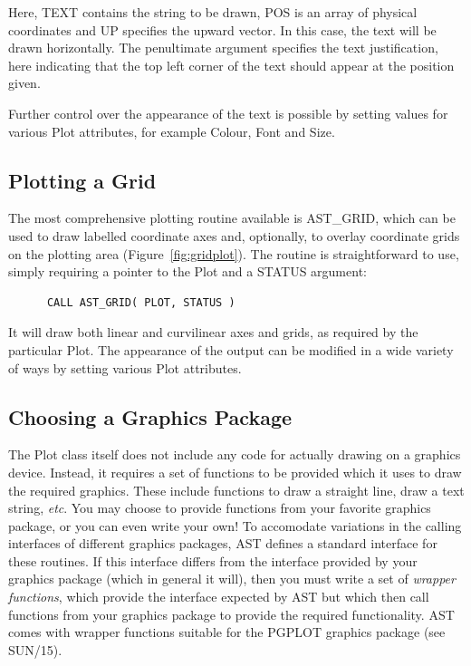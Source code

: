 \documentclass[twoside,11pt]{article}
\newcommand{\htmlref}[2]{#1}
\newcommand{\xref}[3]{#1}
\begin{document}
Here, TEXT contains the string to be drawn, POS is an array of
physical coordinates and UP specifies the upward vector. In this case,
the text will be drawn horizontally. The penultimate argument
specifies the text justification, here indicating that the top left
corner of the text should appear at the position given.

Further control over the appearance of the text is possible by setting
values for various Plot attributes, for example Colour, Font and Size.

\subsection{\label{ss:plottingagrid}Plotting a Grid}

The most comprehensive plotting routine available is \htmlref{AST\_GRID}{AST_GRID}, which
can be used to draw labelled coordinate axes and, optionally, to
overlay coordinate grids on the plotting area
(Figure~\ref{fig:gridplot}). The routine is straightforward to use,
simply requiring a pointer to the \htmlref{Plot}{Plot} and a STATUS argument:

\small
\begin{verbatim}
      CALL AST_GRID( PLOT, STATUS )
\end{verbatim}
\normalsize

It will draw both linear and curvilinear axes and grids, as required
by the particular Plot. The appearance of the output can be modified
in a wide variety of ways by setting various Plot attributes.

\subsection{\label{ss:choosingagraphicspackage}Choosing a Graphics Package}
The \htmlref{Plot}{Plot} class itself does not include any code for actually drawing on a
graphics device. Instead, it requires a set of functions to be provided
which it uses to draw the required graphics. These include functions
to draw a straight line, draw a text string, \emph{etc}. You may choose
to provide functions from your favorite graphics package, or you can even
write your own! To accomodate variations in the calling interfaces of
different graphics packages, AST defines a standard interface for these
routines. If this interface differs from the interface provided by your
graphics package (which in general it will), then you must write a set of
\emph{wrapper functions}, which provide the interface expected by AST but
which then call functions from your graphics package to provide the
required functionality. AST comes with wrapper functions suitable for
the PGPLOT graphics package (see \xref{SUN/15}{sun15}{}).
\end{document}
